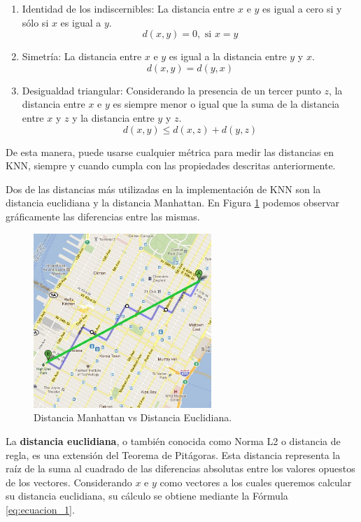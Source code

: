 \documentclass[12pt,a4paper]{article}
\begin{document}
\begin{sloppypar}
\begin{enumerate}
\item Identidad de los indiscernibles: La distancia entre $x$ e $y$ es igual a cero si y sólo si $x$ es igual a $y$.
\[d(x,y) = 0, \text{   si  } x=y\]

\item Simetría:  La distancia entre $x$ e $y$ es igual a la distancia entre $y$ y $x$.
$$d(x,y) = d(y,x)$$

\item Desigualdad triangular: Considerando la presencia de un tercer punto $z$, la distancia entre $x$ e $y$ es siempre menor o igual que la suma de la distancia entre $x$ y $z$ y la distancia entre $y$ y $z$. 
$$d(x,y) \leq d(x,z) + d(y,z)$$
\end{enumerate}

De esta manera, puede usarse cualquier métrica para medir las distancias en KNN, siempre y cuando cumpla con las propiedades descritas anteriormente.

Dos de las distancias más utilizadas en la implementación de KNN son la distancia euclidiana y la distancia Manhattan. En  Figura \ref{fig:Man_euc} podemos observar gráficamente las diferencias entre las mismas.

\begin{figure}[H]    %
 \centering
 \includegraphics[width=0.6\textwidth]{images/Manhattan_Euclidiana.png}
 \captionsetup{justification=centering,margin=2cm}
 \caption{Distancia Manhattan vs Distancia Euclidiana\cite{apunte_uba}.} 
 \label{fig:Man_euc}
\end{figure}

La \textbf{distancia euclidiana}, o también conocida como Norma L2 o distancia de regla, es una extensión del Teorema de Pitágoras. Esta distancia representa la raíz de la suma al cuadrado de las diferencias absolutas entre los valores opuestos de los vectores. Considerando $x$ e $y$ como vectores a los cuales queremos calcular su distancia euclidiana, su cálculo se obtiene mediante la Fórmula \ref{eq:ecuacion_1}.


\end{sloppypar}
\end{document}
